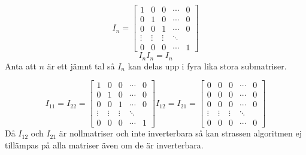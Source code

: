 $$ I_n =
 \begin{bmatrix}
   1 & 0 & 0 & \cdots & 0 \\
  0 & 1 & 0 & \cdots & 0 \\
  0 & 0 & 1 & \cdots & 0 \\
  \vdots  & \vdots  & \vdots & \ddots  \\
  0 & 0 & 0 & \cdots & 1
 \end{bmatrix}
 $$
 $$I_nI_n=I_n$$
 Anta att $n$ är ett jämnt tal så $I_n$ kan delas upp i fyra lika stora submatriser.
 
  $$ I_{11}=I_{22} =
 \begin{bmatrix}
   1 & 0 & 0 & \cdots & 0 \\
  0 & 1 & 0 & \cdots & 0 \\
  0 & 0 & 1 & \cdots & 0 \\
  \vdots  & \vdots  & \vdots & \ddots  \\
  0 & 0 & 0 & \cdots & 1
 \end{bmatrix}
 I_{12}=I_{21}=
  \begin{bmatrix}
   0 & 0 & 0 & \cdots & 0 \\
  0 & 0 & 0 & \cdots & 0 \\
  0 & 0 & 0 & \cdots & 0 \\
  \vdots  & \vdots  & \vdots & \ddots  \\
  0 & 0 & 0 & \cdots & 0
 \end{bmatrix}
 $$
 Då $I_{12}$ och $I_{21}$ är nollmatriser och inte inverterbara så kan strassen algoritmen ej tillämpas på alla matriser även om de är inverterbara. 
 
